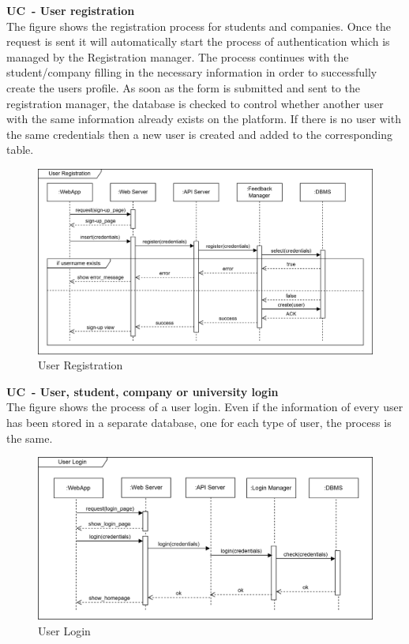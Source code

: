 \textbf{UC\cuc\  - User registration} \\
The figure shows the registration process for students and companies. Once the request is sent it will automatically start the process of authentication which is managed by the Registration manager. The process continues with the student/company filling in the necessary information in order to successfully create the users profile. As soon as the form is submitted and sent to the registration manager, the database is checked to control whether another user with the same information already exists on the platform. If there is no user with the same credentials then a new user is created and added to the corresponding table.
\begin{center}
    \begin{figure}[H]
        \centering
        \includegraphics[width=1\linewidth]{Images/Sequence diagrams/UC1.png}
        \caption{User Registration}
        \label{fig:enter-label}
    \end{figure}
\end{center}

\textbf{UC\cuc\  - User, student, company or university login} \\
The figure shows the process of a user login. Even if the information of every user has been stored in a separate database, one for each type of user, the process is the same.
\begin{center}
    \begin{figure}[H]
        \centering
        \includegraphics[width=1\linewidth]{Images/Sequence diagrams/UC2.png}
        \caption{User Login}
        \label{fig:enter-label}
    \end{figure}
\end{center}
    

